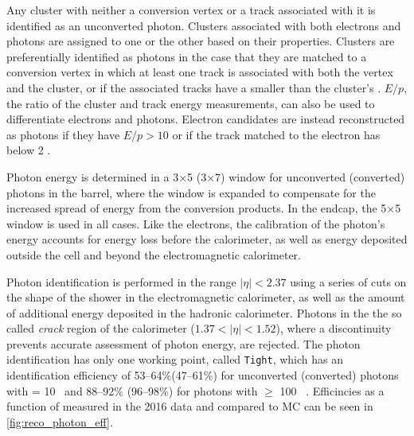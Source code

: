 Any cluster with neither a conversion vertex or a track associated with it is identified as an unconverted photon. Clusters associated with both electrons and photons are assigned to one or the other based on their properties. Clusters are preferentially identified as photons in the case that they are matched to a conversion vertex in which at least one track is associated with both the vertex and the cluster, or if the associated tracks have a \pt smaller than the cluster's \pt. $E/p$, the ratio of the cluster and track energy measurements, can also be used to differentiate electrons and photons. Electron candidates are instead reconstructed as photons if they have $E/p>10$ or if the track matched to the electron has \pt below 2 \gev. 


Photon energy is determined in a 3$\times$5 (3$\times$7) window for unconverted (converted) photons in the barrel, where the window is expanded to compensate for the increased spread of energy from the conversion products. In the endcap, the 5$\times$5 window is used in all cases. Like the electrons, the calibration of the photon's energy accounts for energy loss before the calorimeter, as well as energy deposited outside the cell and beyond the electromagnetic calorimeter.

Photon identification is performed in the range $|\eta|<2.37$ using a series of cuts on the shape of the shower in the electromagnetic calorimeter, as well as the amount of additional energy deposited in the hadronic calorimeter. Photons in the the so called \textit{crack} region of the calorimeter ($1.37<|\eta|<1.52$), where a discontinuity prevents accurate assessment of photon energy, are rejected. The photon identification has only one working point, called \texttt{Tight}, which has an identification efficiency of 53–64\%(47–61\%) for unconverted (converted) photons with \et = 10 \gev~and 88–92\% (96–98\%) for photons with \et $\geq$ 100 \gev~\cite{ATL-PHYS-PUB-2016-014}. Efficincies as a function of \pt measured in the 2016 data and compared to \ac{MC} can be seen in \autoref{fig:reco_photon_eff}.

